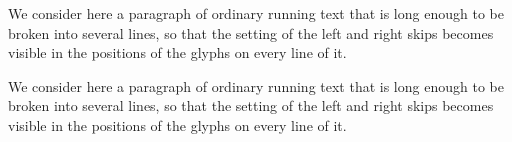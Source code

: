 \hsize=4in \raggedright
We consider here a paragraph of ordinary running text that is long enough to be broken into several lines, so that the setting of the left and right skips becomes visible in the positions of the glyphs on every line of it.

We consider here a paragraph of ordinary running text that is long enough to be broken into several lines, so that the setting of the left and right skips becomes visible in the positions of the glyphs on every line of it.
\bye
